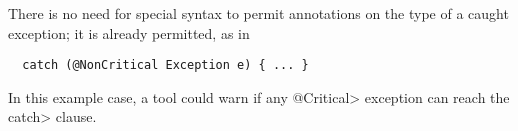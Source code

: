 \documentclass[10pt]{article}
\begin{document}

There is no need for special syntax to permit annotations on the type of a
caught exception; it is already permitted, as in

\preverbnegspace
\begin{Verbatim}
  catch (@NonCritical Exception e) { ... }
\end{Verbatim}

\noindent
In this example case, a tool could warn if any \<@Critical> exception can
reach the \<catch> clause.

% 
% 
% 
% 



% 
\end{document}
